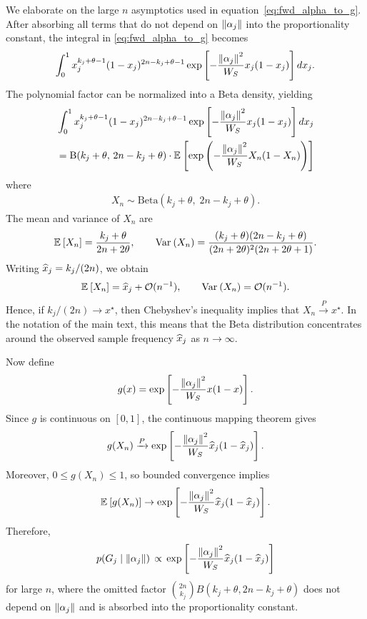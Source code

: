 \documentclass[10pt]{article}
\begin{document}
We elaborate on the large $n$ asymptotics used in equation~\eqref{eq:fwd_alpha_to_g}.
After absorbing all terms that do not depend on $\left\| \alpha_j \right\|$ into the proportionality constant, the integral in \eqref{eq:fwd_alpha_to_g} becomes
\begin{align}
    \int_0^1
    x_j^{k_j+\theta-1}(1-x_j)^{2n-k_j+\theta-1}
    \exp\left[-\frac{\left\| \alpha_j \right\|^2}{W_S}x_j(1-x_j)\right]dx_j.
\end{align}
The polynomial factor can be normalized into a Beta density, yielding
\begin{align}
    \begin{aligned}
    &
    \int_0^1
    x_j^{k_j+\theta-1}(1-x_j)^{2n-k_j+\theta-1}
    \exp\left[-\frac{\left\| \alpha_j \right\|^2}{W_S}x_j(1-x_j)\right]dx_j \\
    &=
    \mathrm{B}(k_j+\theta,\,2n-k_j+\theta)
    \cdot
    \mathbb{E}_{}\left[
    \exp\left(-\frac{\left\| \alpha_j \right\|^2}{W_S}X_n(1-X_n)\right)
    \right]
    \end{aligned}
\end{align}
where
\begin{align}
    X_n \sim \mathrm{Beta}(k_j+\theta,\;2n-k_j+\theta).
\end{align}
The mean and variance of $X_n$ are
\begin{align}
    \mathbb{E}_{}\left[X_n\right] = \frac{k_j+\theta}{2n+2\theta},
    \qquad
    \mathrm{Var}_{}\left(X_n\right)
    =
    \frac{(k_j+\theta)(2n-k_j+\theta)}
    {(2n+2\theta)^2(2n+2\theta+1)}.
\end{align}
Writing $\widehat{x}_j = k_j/(2n)$, we obtain
\begin{align}
    \mathbb{E}_{}\left[X_n\right] = \widehat{x}_j + \mathcal{O}(n^{-1}),
    \qquad
    \mathrm{Var}_{}\left(X_n\right) = \mathcal{O}(n^{-1}).
\end{align}
Hence, if $k_j/(2n) \to x^\star$, then Chebyshev's inequality implies that $X_n \xrightarrow{P} x^\star$.
In the notation of the main text, this means that the Beta distribution concentrates around the observed sample frequency $\widehat{x}_j$ as $n \to \infty$.

Now define
\begin{align}
    g(x)=\exp\left[-\frac{\left\| \alpha_j \right\|^2}{W_S}x(1-x)\right].
\end{align}
Since $g$ is continuous on $[0,1]$, the continuous mapping theorem gives
\begin{align}
    g(X_n) \xrightarrow{P}
    \exp\left[-\frac{\left\| \alpha_j \right\|^2}{W_S}\widehat{x}_j(1-\widehat{x}_j)\right].
\end{align}
Moreover, $0 \le g(X_n) \le 1$, so bounded convergence implies
\begin{align}
    \mathbb{E}_{}\left[g(X_n)\right]
    \to
    \exp\left[-\frac{\left\| \alpha_j \right\|^2}{W_S}\widehat{x}_j(1-\widehat{x}_j)\right].
\end{align}
Therefore,
\begin{align}
    p(G_j \mid \left\| \alpha_j \right\|)
    \, \propto \,
    \exp\left[-\frac{\left\| \alpha_j \right\|^2}{W_S}\widehat{x}_j(1-\widehat{x}_j)\right]
\end{align}
for large $n$, where the omitted factor $\binom{2n}{k_j}B(k_j+\theta,2n-k_j+\theta)$ does not depend on $\left\| \alpha_j \right\|$ and is absorbed into the proportionality constant.
\end{document}
